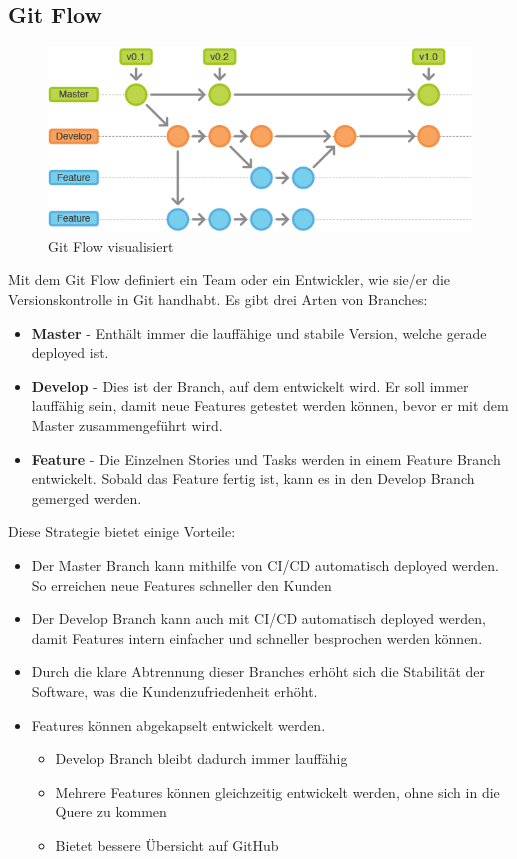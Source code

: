 \subsection{Git Flow}
\begin{figure}[!ht]
  \centering
  \includegraphics[width=0.8\linewidth]{./images/Gitflow-Workflow-2.png}
  \caption[\href{https://blog.ordix.de/welches-vorgehen-eignet-sich-fuer-mein-projekt}{Grafik, welche den Git Flow Arbeitsablauf visualisiert}]{Git Flow visualisiert}
  \label{fig:git-flow}
\end{figure}
Mit dem Git Flow definiert ein Team oder ein Entwickler, wie sie/er die Versionskontrolle in Git handhabt. Es gibt drei Arten von Branches:
\begin{itemize}
  \item \textbf{Master} - Enthält immer die lauffähige und stabile Version, welche gerade deployed ist.
  \item \textbf{Develop} - Dies ist der Branch, auf dem entwickelt wird. Er soll immer lauffähig sein, damit neue Features getestet werden können, bevor er mit dem Master zusammengeführt wird.
  \item \textbf{Feature} - Die Einzelnen Stories und Tasks werden in einem Feature Branch entwickelt. Sobald das Feature fertig ist, kann es in den Develop Branch gemerged werden.
\end{itemize}
Diese Strategie bietet einige Vorteile:
\begin{itemize}
  \item Der Master Branch kann mithilfe von CI/CD automatisch deployed werden. So erreichen neue Features schneller den Kunden
  \item Der Develop Branch kann auch mit CI/CD automatisch deployed werden, damit Features intern einfacher und schneller besprochen werden können.
  \item Durch die klare Abtrennung dieser Branches erhöht sich die Stabilität der Software, was die Kundenzufriedenheit erhöht.
  \item Features können abgekapselt entwickelt werden.
  \begin{itemize}
    \item Develop Branch bleibt dadurch immer lauffähig
    \item Mehrere Features können gleichzeitig entwickelt werden, ohne sich in die Quere zu kommen
    \item Bietet bessere Übersicht auf GitHub
  \end{itemize}
\end{itemize}
